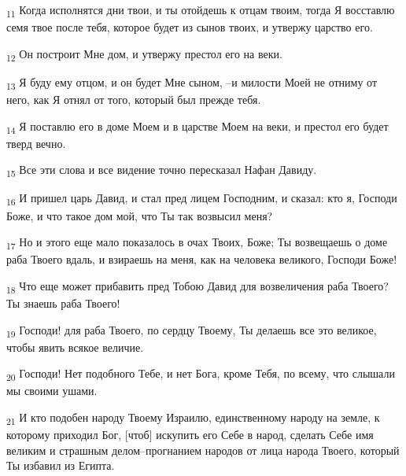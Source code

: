 \begin{tcolorbox}
\textsubscript{11} Когда исполнятся дни твои, и ты отойдешь к отцам твоим, тогда Я восставлю семя твое после тебя, которое будет из сынов твоих, и утвержу царство его.
\end{tcolorbox}
\begin{tcolorbox}
\textsubscript{12} Он построит Мне дом, и утвержу престол его на веки.
\end{tcolorbox}
\begin{tcolorbox}
\textsubscript{13} Я буду ему отцом, и он будет Мне сыном, --и милости Моей не отниму от него, как Я отнял от того, который был прежде тебя.
\end{tcolorbox}
\begin{tcolorbox}
\textsubscript{14} Я поставлю его в доме Моем и в царстве Моем на веки, и престол его будет тверд вечно.
\end{tcolorbox}
\begin{tcolorbox}
\textsubscript{15} Все эти слова и все видение точно пересказал Нафан Давиду.
\end{tcolorbox}
\begin{tcolorbox}
\textsubscript{16} И пришел царь Давид, и стал пред лицем Господним, и сказал: кто я, Господи Боже, и что такое дом мой, что Ты так возвысил меня?
\end{tcolorbox}
\begin{tcolorbox}
\textsubscript{17} Но и этого еще мало показалось в очах Твоих, Боже; Ты возвещаешь о доме раба Твоего вдаль, и взираешь на меня, как на человека великого, Господи Боже!
\end{tcolorbox}
\begin{tcolorbox}
\textsubscript{18} Что еще может прибавить пред Тобою Давид для возвеличения раба Твоего? Ты знаешь раба Твоего!
\end{tcolorbox}
\begin{tcolorbox}
\textsubscript{19} Господи! для раба Твоего, по сердцу Твоему, Ты делаешь все это великое, чтобы явить всякое величие.
\end{tcolorbox}
\begin{tcolorbox}
\textsubscript{20} Господи! Нет подобного Тебе, и нет Бога, кроме Тебя, по всему, что слышали мы своими ушами.
\end{tcolorbox}
\begin{tcolorbox}
\textsubscript{21} И кто подобен народу Твоему Израилю, единственному народу на земле, к которому приходил Бог, [чтоб] искупить его Себе в народ, сделать Себе имя великим и страшным делом--прогнанием народов от лица народа Твоего, который Ты избавил из Египта.
\end{tcolorbox}

